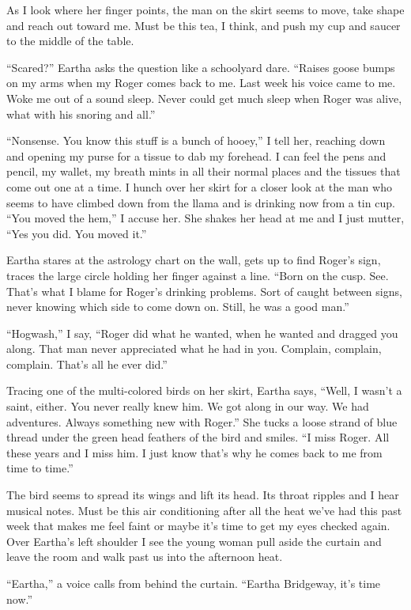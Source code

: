\documentclass[
]{article}
\begin{document}
As I look where her finger points, the man on the skirt seems to move,
take shape and reach out toward me. Must be this tea, I think, and push
my cup and saucer to the middle of the table.

``Scared?'' Eartha asks the question like a schoolyard dare. ``Raises
goose bumps on my arms when my Roger comes back to me. Last week his
voice came to me. Woke me out of a sound sleep. Never could get much
sleep when Roger was alive, what with his snoring and all.''

``Nonsense. You know this stuff is a bunch of hooey,'' I tell her,
reaching down and opening my purse for a tissue to dab my forehead. I
can feel the pens and pencil, my wallet, my breath mints in all their
normal places and the tissues that come out one at a time. I hunch over
her skirt for a closer look at the man who seems to have climbed down
from the llama and is drinking now from a tin cup. ``You moved the
hem,'' I accuse her. She shakes her head at me and I just mutter, ``Yes
you did. You moved it.''

Eartha stares at the astrology chart on the wall, gets up to find
Roger's sign, traces the large circle holding her finger against a line.
``Born on the cusp. See. That's what I blame for Roger's drink­ing
problems. Sort of caught between signs, never knowing which side to come
down on. Still, he was a good man.''

``Hogwash,'' I say, ``Roger did what he wanted, when he wanted and
dragged you along. That man never appreciated what he had in you.
Complain, complain, complain. That's all he ever did.''

Tracing one of the multi-colored birds on her skirt, Eartha says,
``Well, I wasn't a saint, either. You never really knew him. We got
along in our way. We had adventures. Always something new with Roger.''
She tucks a loose strand of blue thread under the green head feathers of
the bird and smiles. ``I miss Roger. All these years and I miss him. I
just know that's why he comes back to me from time to time.''

The bird seems to spread its wings and lift its head. Its throat ripples
and I hear musical notes. Must be this air conditioning after all the
heat we've had this past week that makes me feel faint or maybe it's
time to get my eyes checked again. Over Eartha's left shoulder I see the
young woman pull aside the curtain and leave the room and walk past us
into the afternoon heat.

``Eartha,'' a voice calls from behind the curtain. ``Eartha Bridgeway,
it's time now.''
\end{document}
